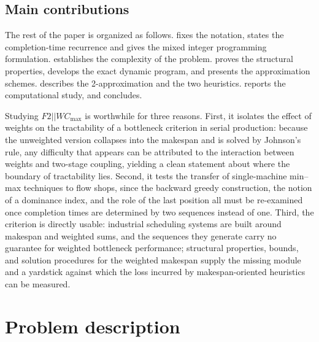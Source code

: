 \documentclass[12pt]{article} \textheight=24.5cm \textwidth=16.5cm \parskip = 0.165cm
\let\origsection\section
\renewcommand{\section}{\FloatBarrier\origsection}
\begin{document}
\begin{sloppypar}
        \subsection{Main contributions}
        
        The rest of the paper is organized as follows.
         fixes the notation, states the completion-time recurrence and gives the mixed integer programming formulation.
         establishes the complexity of the problem.
         proves the structural properties, develops the exact dynamic program, and presents the approximation schemes.
         describes the 2-approximation and the two heuristics.
         reports the computational study, and  concludes.
        
         Studying $F2||WC_{\max}$ is worthwhile for three reasons. First, it isolates the
        effect of weights on the tractability of a bottleneck criterion in serial
        production: because the unweighted version collapses into the makespan and is
        solved by Johnson's rule, any difficulty that appears can be attributed to the
        interaction between weights and two-stage coupling, yielding a clean statement
        about where the boundary of tractability lies. Second, it tests the transfer of
        single-machine min--max techniques to flow shops, since the backward greedy
        construction, the notion of a dominance index, and the role of the last position
        all must be re-examined once completion times are determined by two sequences
        instead of one. Third, the criterion is directly usable: industrial scheduling
        systems are built around makespan and weighted sums, and the sequences they
        generate carry no guarantee for weighted bottleneck performance; structural
        properties, bounds, and solution procedures for the weighted makespan supply the
        missing module and a yardstick against which the loss incurred by
        makespan-oriented heuristics can be measured.
        \section{Problem description} \label{sec:preliminaries}
        

\end{sloppypar}
\end{document}
